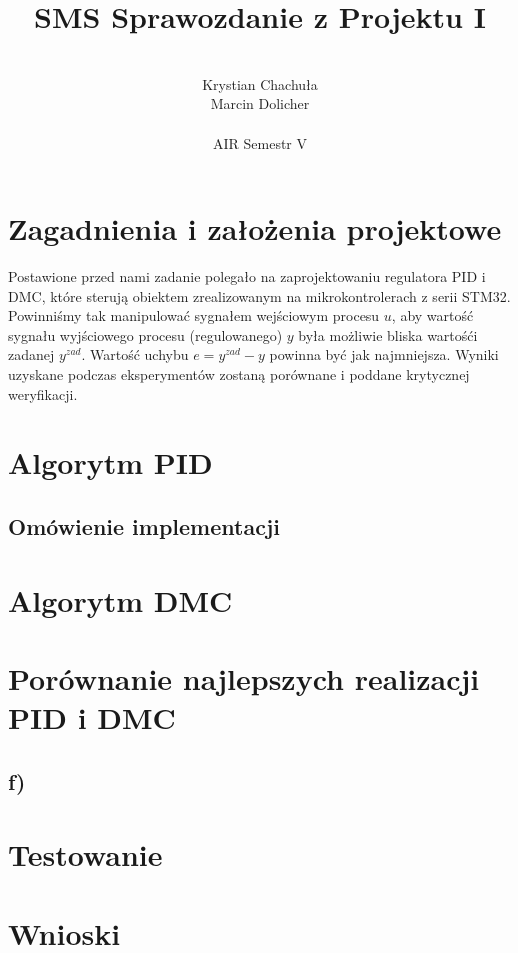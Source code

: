 \documentclass[12pt, a4paper]{article}
\author{
	\\ Krystian Chachuła
	\\ Marcin Dolicher
	\\
	\\ AIR Semestr V
}
\title{
    \quad \quad \quad \quad \quad SMS
	\newline
	Sprawozdanie z Projektu I		
}
\date{}
\begin{document}
\maketitle
\newpage
\tableofcontents

\newpage
\section{Zagadnienia i założenia projektowe}
Postawione przed nami zadanie polegało na zaprojektowaniu regulatora PID i DMC, które sterują obiektem zrealizowanym na mikrokontrolerach z serii STM32. Powinniśmy tak manipulować sygnałem wejściowym procesu $u$, aby wartość sygnału wyjściowego procesu (regulowanego) $y$ była możliwie bliska wartośći zadanej $y^{zad}$. Wartość uchybu $e=y^{zad} - y$ powinna być jak najmniejsza. Wyniki uzyskane podczas eksperymentów zostaną porównane i poddane krytycznej weryfikacji. 
\section{Algorytm PID}

\subsection{Omówienie implementacji}

\section{Algorytm DMC}

\section{Porównanie najlepszych realizacji PID i DMC}

\subsection{f) }
\begin{figure}[h!]
\end{figure}

\section{Testowanie}

\section{Wnioski}
\end{document}
